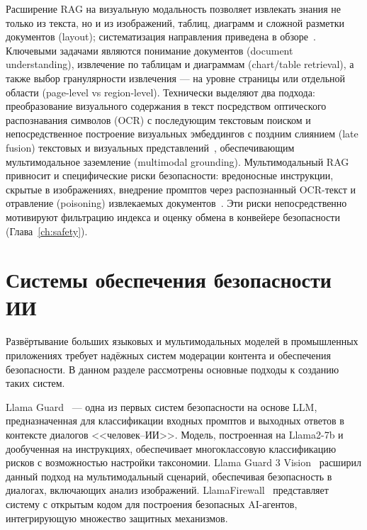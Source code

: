 Расширение RAG на визуальную модальность позволяет извлекать знания не только из текста, но и из изображений, таблиц, диаграмм и сложной разметки документов (layout); систематизация направления приведена в обзоре~\cite{2504.08748}. Ключевыми задачами являются понимание документов (document understanding), извлечение по таблицам и диаграммам (chart/table retrieval), а также выбор гранулярности извлечения --- на уровне страницы или отдельной области (page-level vs region-level). Технически выделяют два подхода: преобразование визуального содержания в текст посредством оптического распознавания символов (OCR) с последующим текстовым поиском и непосредственное построение визуальных эмбеддингов с поздним слиянием (late fusion) текстовых и визуальных представлений~\cite{2411.02571}, обеспечивающим мультимодальное заземление (multimodal grounding). Мультимодальный RAG привносит и специфические риски безопасности: вредоносные инструкции, скрытые в изображениях, внедрение промптов через распознанный OCR-текст и отравление (poisoning) извлекаемых документов~\cite{2501.18636}. Эти риски непосредственно мотивируют фильтрацию индекса и оценку обмена в конвейере безопасности (Глава~\ref{ch:safety}).

\section{Системы обеспечения безопасности ИИ}\label{sec:ai_safety}

Развёртывание больших языковых и мультимодальных моделей в промышленных приложениях требует надёжных систем модерации контента и обеспечения безопасности. В данном разделе рассмотрены основные подходы к созданию таких систем.

Llama Guard~\cite{2312.06674} --- одна из первых систем безопасности на основе LLM, предназначенная для классификации входных промптов и выходных ответов в контексте диалогов <<человек--ИИ>>. Модель, построенная на Llama2-7b и дообученная на инструкциях, обеспечивает многоклассовую классификацию рисков с возможностью настройки таксономии. Llama Guard 3 Vision~\cite{2411.10414} расширил данный подход на мультимодальный сценарий, обеспечивая безопасность в диалогах, включающих анализ изображений. LlamaFirewall~\cite{2505.03574} представляет систему с открытым кодом для построения безопасных AI-агентов, интегрирующую множество защитных механизмов.

